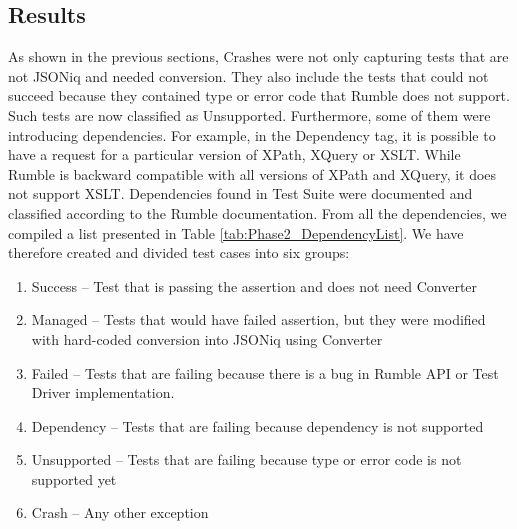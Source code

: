 \subsection{Results}
\label{Phase2_Results}
As shown in the previous sections, Crashes were not only capturing tests that are not JSONiq and needed conversion. They also include the tests that could not succeed because they contained type or error code that Rumble does not support. Such tests are now classified as Unsupported. Furthermore, some of them were introducing dependencies. For example, in the Dependency tag, it is possible to have a request for a particular version of XPath, XQuery or XSLT. While Rumble is backward compatible with all versions of XPath and XQuery, it does not support XSLT. Dependencies found in Test Suite were documented and classified according to the Rumble documentation. From all the dependencies, we compiled a list presented in Table \ref{tab:Phase2_DependencyList}. We have therefore created and divided test cases into six groups:
\begin{enumerate}
	\item Success – Test that is passing the assertion and does not need Converter
	\item Managed – Tests that would have failed assertion, but they were modified with hard-coded conversion into JSONiq using Converter
	\item Failed – Tests that are failing because there is a bug in Rumble API or Test Driver implementation. 
	\item Dependency – Tests that are failing because dependency is not supported
	\item Unsupported – Tests that are failing because type or error code is not supported yet
	\item Crash – Any other exception
\end{enumerate}


